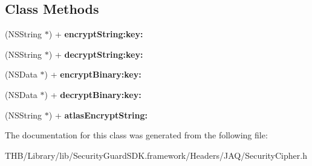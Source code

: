 \subsection*{Class Methods}
\begin{DoxyCompactItemize}
\item 
\mbox{\label{interface_security_cipher_a9b80375c7a9c64e8aafa0a79a0098b82}} 
(N\+S\+String $\ast$) + {\bfseries encrypt\+String\+:key\+:}
\item 
\mbox{\label{interface_security_cipher_a6c35db6fab0d4cb0ab3d0da46f7b8103}} 
(N\+S\+String $\ast$) + {\bfseries decrypt\+String\+:key\+:}
\item 
\mbox{\label{interface_security_cipher_a87e077dfa58c678ebaab5f2129fb566b}} 
(N\+S\+Data $\ast$) + {\bfseries encrypt\+Binary\+:key\+:}
\item 
\mbox{\label{interface_security_cipher_ab72cae8b2536fd59912670b5ac2a41e7}} 
(N\+S\+Data $\ast$) + {\bfseries decrypt\+Binary\+:key\+:}
\item 
\mbox{\label{interface_security_cipher_ae90343a091558248088d103f39ef3dc4}} 
(N\+S\+String $\ast$) + {\bfseries atlas\+Encrypt\+String\+:}
\end{DoxyCompactItemize}


The documentation for this class was generated from the following file\+:\begin{DoxyCompactItemize}
\item 
T\+H\+B/\+Library/lib/\+Security\+Guard\+S\+D\+K.\+framework/\+Headers/\+J\+A\+Q/Security\+Cipher.\+h\end{DoxyCompactItemize}
